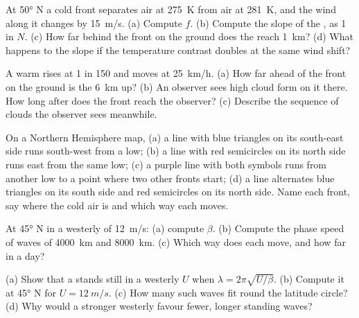 \begin{exercise}[$\star$]\label{exo:b2:weather-systems:1}
At \ang{50} N a cold front separates air at \qty{275}{K} from air at \qty{281}{K}, and the wind
along it changes by \qty{15}{m/s}. (a) Compute $f$. (b) Compute the slope of the ,
as 1 in $N$. (c) How far behind the front on the ground does the  reach
\qty{1}{km}? (d) What happens to the slope if the temperature contrast doubles at the same wind
shift?
\end{exercise}

\begin{exercise}[$\star$]\label{exo:b2:weather-systems:2}
A warm  rises at 1 in 150 and moves at \qty{25}{km/h}. (a) How far ahead of the
front on the ground is the  \qty{6}{km} up? (b) An observer sees high cloud form
on it there. How long after does the front reach the observer? (c) Describe the sequence of
clouds the observer sees meanwhile.
\end{exercise}

\begin{exercise}[$\star$]\label{exo:b2:weather-systems:3}
On a Northern Hemisphere map, (a) a line with blue triangles on its south-east side runs south-west
from a low; (b) a line with red semicircles on its north side runs east from the same low; (c) a
purple line with both symbols runs from another low to a point where two other fronts start;
(d) a line alternates blue triangles on its south side and red semicircles on its north side.
Name each front, say where the cold air is and which way each moves.
\end{exercise}

\begin{exercise}[$\star$]\label{exo:b2:weather-systems:4}
At \ang{45} N in a westerly of \qty{12}{m/s}: (a) compute $\beta$. (b) Compute the phase speed
of waves of \qty{4000}{km} and \qty{8000}{km}. (c) Which way does each move, and how far in a
day?
\end{exercise}

\begin{exercise}[$\star\star$]\label{exo:b2:weather-systems:5}
(a) Show that a  stands still in a westerly $U$ when $\lambda = 2\pi\sqrt{U/\beta}$.
(b) Compute it at \ang{45} N for $U = \qty{12}{m/s}$. (c) How many such waves fit round the
latitude circle? (d) Why would a stronger westerly favour fewer, longer standing waves?
\end{exercise}

